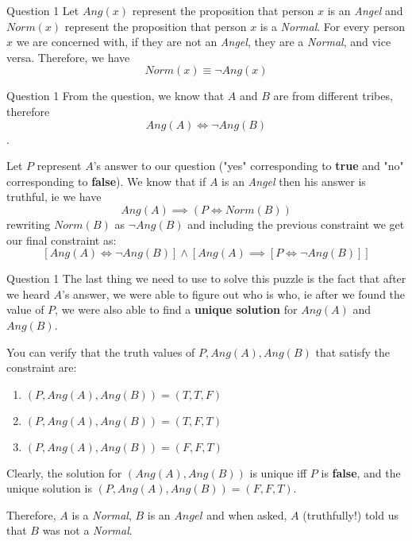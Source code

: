 \documentclass{beamer}
\begin{document}
{\begin{frame}{Question 1}
            Let $Ang(x)$ represent the proposition that person $x$ is an \textit{Angel} and $Norm(x)$ represent the proposition that person $x$ is a \textit{Normal}. For every person $x$ we are concerned with, if they are not an \textit{Angel}, they are a \textit{Normal}, and vice versa. Therefore, we have $$Norm(x) \equiv \neg Ang(x)$$%
        \end{frame}
        \begin{frame}{Question 1}
            From the question, we know that $A$ and $B$ are from different tribes, therefore $$Ang(A) \iff \neg Ang(B)$$.

            Let $P$ represent $A$'s answer to our question ("yes" corresponding to \textbf{true} and "no" corresponding to \textbf{false}). We know that if $A$ is an \textit{Angel} then his answer is truthful, ie we have $$Ang(A) \implies (P \iff Norm(B))$$rewriting $Norm(B)$ as $\neg Ang(B)$ and including the previous constraint we get our final constraint as:
            \begin{equation*}
                \boxed{\left[Ang(A) \iff \neg Ang(B)\right] \land \left[Ang(A) \implies \left[P \iff \neg Ang(B)\right]\right]}
            \end{equation*}
        \end{frame}
        \begin{frame}{Question 1}
            The last thing we need to use to solve this puzzle is the fact that after we heard $A$'s answer, we were able to figure out who is who, ie after we found the value of $P$, we were also able to find a \textbf{unique solution} for $Ang(A)$ and $Ang(B)$.

            You can verify that the truth values of $P, Ang(A), Ang(B)$ that satisfy the constraint are:
            \begin{enumerate}
                \item $(P, Ang(A), Ang(B)) = (T, T, F)$
                \item $(P, Ang(A), Ang(B)) = (T, F, T)$
                \item $(P, Ang(A), Ang(B)) = (F, F, T)$
            \end{enumerate}
            Clearly, the solution for $(Ang(A), Ang(B))$ is unique iff $P$ is \textbf{false}, and the unique solution is $(P, Ang(A), Ang(B)) = (F, F, T)$.

            Therefore, $A$ is a \textit{Normal}, $B$ is an $\textit{Angel}$ and when asked, $A$ (truthfully!) told us that $B$ was not a \textit{Normal}.
        \end{frame}
    }
\end{document}
